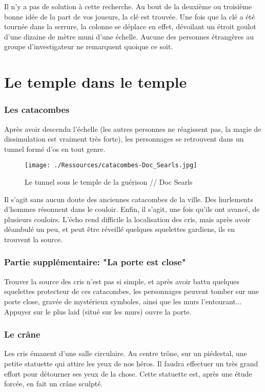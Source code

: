 \documentclass[a4paper]{article}
\begin{document}
Il n'y a pas de solution à cette recherche. Au bout de la deuxième ou troisième bonne idée de la part de vos joueurs, la clé est trouvée.
\newline
Une fois que la clé a été tournée dans la serrure, la colonne se déplace en effet, dévoilant un étroit goulot d'une dizaine de mètre muni d'une échelle. Aucune des personnes étrangères au groupe d'investigateur ne remarquent quoique ce soit.

\section{Le temple dans le temple} 
\subsubsection{Les catacombes}
Après avoir descendu l'échelle (les autres personnes ne réagissent pas, la magie de dissimulation est vraiment très forte), les personnages se retrouvent dans un tunnel formé d'os en tout genre.

\begin{figure}[ht]
\begin{center}
\hypertarget{catacombes}{}
\texttt{[image: ./Ressources/catacombes-Doc\_Searls.jpg]}
\caption{Le tunnel sous le temple de la guérison // Doc Searls }
\end{center}
\end{figure}

Il s'agit sans aucun doute des anciennes catacombes de la ville. Des hurlements d'hommes résonnent dans le couloir. Enfin, il s'agit, une fois qu'ils ont avancé, de plusieurs couloirs. L'écho rend difficile la localisation des cris, mais après avoir déambulé un peu, et peut être réveillé quelques squelettes gardiens, ils en trouvent la source.

\subsubsection{Partie supplémentaire: "La porte est close"}
Trouver la source des cris n'est pas si simple, et après avoir battu quelques squelettes protecteur de ces catacombes, les personnages peuvent tomber sur une porte close, gravée de mystérieux symboles, ainsi que les murs l'entourant... Appuyer sur le plus laid (situé sur les murs) ouvre la porte.

\subsubsection{Le crâne}
Les cris émanent d'une salle circulaire. Au centre trône, sur un piédestal, une petite statuette qui attire les yeux de nos héros. Il faudra effectuer un très grand effort pour détourner ses yeux de la chose. Cette statuette est, après une étude forcée, en fait un crâne sculpté.
\end{document}
